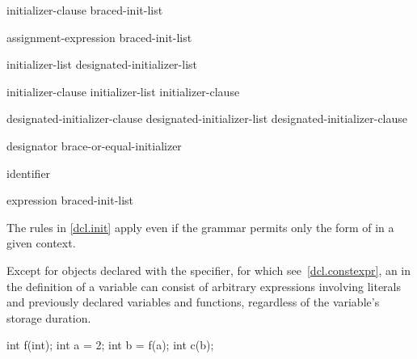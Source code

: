 \begin{bnf}
\br
    \terminal{=} initializer-clause\br
    braced-init-list
\end{bnf}

\begin{bnf}
\br
    assignment-expression\br
    braced-init-list
\end{bnf}

\begin{bnf}
\br
    \terminal{\{} initializer-list \opt{\terminal{,}} \terminal{\}}\br
    \terminal{\{} designated-initializer-list \opt{\terminal{,}} \terminal{\}}\br
    \terminal{\{} \terminal{\}}
\end{bnf}

\begin{bnf}
\br
    initializer-clause \br
    initializer-list \terminal{,} initializer-clause 
\end{bnf}

\begin{bnf}
\br
    designated-initializer-clause\br
    designated-initializer-list \terminal{,} designated-initializer-clause
\end{bnf}

\begin{bnf}
\br
    designator brace-or-equal-initializer
\end{bnf}

\begin{bnf}
\br
     identifier
\end{bnf}

\begin{bnf}
\br
    expression\br
    braced-init-list
\end{bnf}

\begin{note}
The rules in \ref{dcl.init} apply even if the grammar permits only
the  form
of  in a given context.
\end{note}

\pnum
Except for objects declared with the  specifier, for which see~\ref{dcl.constexpr},
an  in the definition of a variable can consist of
arbitrary expressions involving literals and previously declared
variables and functions,
regardless of the variable's storage duration.
\begin{example}
\begin{codeblock}
int f(int);
int a = 2;
int b = f(a);
int c(b);
\end{codeblock}
\end{example}

